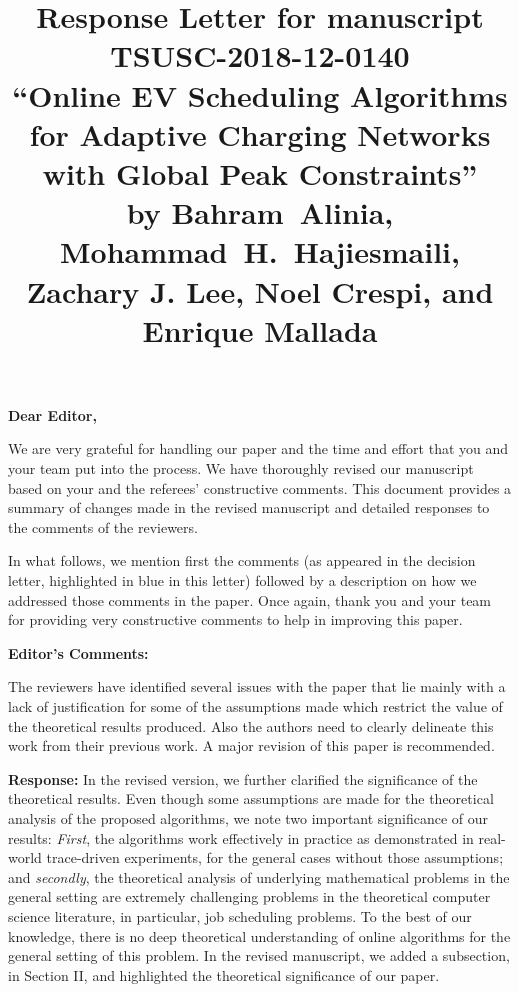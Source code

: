 \documentclass[11pt]{article}
\begin{document}
\title{Response Letter for manuscript TSUSC-2018-12-0140 \\ ``Online EV Scheduling Algorithms for Adaptive Charging Networks with Global Peak Constraints'' \\
	\vspace{4mm} \large
	by  Bahram~Alinia, Mohammad~H.~Hajiesmaili, Zachary J. Lee, Noel Crespi, and Enrique Mallada
}

\maketitle

\textbf{Dear Editor,}

We are very grateful for handling our paper and the time and effort that you and your team put into the process. We have thoroughly revised our manuscript based on your and the referees' constructive comments. This document provides a summary of changes made in the revised manuscript and detailed responses to the comments of the reviewers. 


In what follows, we mention first the comments (as appeared in the decision letter, highlighted in {\color{blue} blue} in this letter) followed by a description on how we addressed those comments in the paper. Once again, thank you and your team for providing very constructive comments to help in improving this paper.



\newpage

{\Large\textbf{Editor's Comments:}}
\vspace{3mm}

{\color{blue}The reviewers have identified several issues with the paper that lie mainly with a lack of justification for some of the assumptions made which restrict the value of the theoretical results produced. Also the authors need to clearly delineate this work from their previous work. A major revision of this paper is recommended.}

\vspace{5mm}
\noindent\textbf{Response:}
In the revised version, we further clarified the significance of the theoretical results. Even though some assumptions are made for the theoretical analysis of the proposed algorithms, we note two important significance of our results: \textit{First}, the algorithms work effectively in practice as demonstrated in real-world trace-driven experiments, for the general cases without those assumptions; and \textit{secondly}, the theoretical analysis of underlying mathematical problems in the general setting are extremely challenging problems in the theoretical computer science literature, in particular, job scheduling problems. To the best of our knowledge, there is no deep theoretical understanding of online algorithms for the general setting of this problem. In the revised manuscript, we added a subsection, in Section II, and highlighted the theoretical significance of our paper. 
\end{document}
